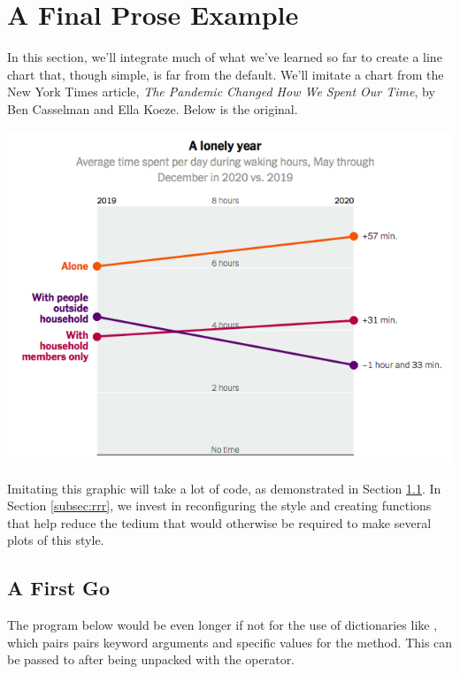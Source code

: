 
\section{A Final Prose Example}

In this section, we'll integrate much of what we've learned so far to create a line chart that, though simple, is far from the default. We'll imitate a chart from the New York Times article, \emph{The Pandemic Changed How We Spent Our Time}, by Ben Casselman and Ella Koeze. Below is the original. 

\begin{center}
    \includegraphics[width = .8\textwidth]{Images/nytATUS.png}
\end{center}

Imitating this graphic will take a lot of code, as demonstrated in Section \ref{subsec:firstgo}. In Section \ref{subsec:rrr}, we invest in reconfiguring the style and creating functions that  help reduce the tedium that would otherwise be required to make several plots of this style. 

\subsection{A First Go}\label{subsec:firstgo}

The program below would be even longer if not for the use of dictionaries like , which pairs pairs keyword arguments and specific values for the  method. This can be passed to  after being unpacked with the \code{**} operator. 

